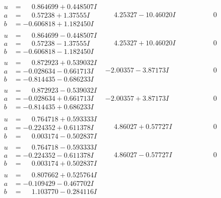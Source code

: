 \documentclass[1p]{elsarticle_modified}
\theoremstyle{definition}
\begin{document}
$$\begin{array}{c|c|c}
\begin{aligned}
u &= \phantom{-}0.864699 + 0.448507 I \\
a &= \phantom{-}0.57238 + 1.37555 I \\
b &= -0.606818 + 1.182450 I\end{aligned}
 & \phantom{-}4.25327 - 10.46020 I & \phantom{-0.000000 } 0 \\ \hline\begin{aligned}
u &= \phantom{-}0.864699 - 0.448507 I \\
a &= \phantom{-}0.57238 - 1.37555 I \\
b &= -0.606818 - 1.182450 I\end{aligned}
 & \phantom{-}4.25327 + 10.46020 I & \phantom{-0.000000 } 0 \\ \hline\begin{aligned}
u &= \phantom{-}0.872923 + 0.539032 I \\
a &= -0.028634 - 0.661713 I \\
b &= -0.814435 - 0.686233 I\end{aligned}
 & -2.00357 - 3.87173 I & \phantom{-0.000000 } 0 \\ \hline\begin{aligned}
u &= \phantom{-}0.872923 - 0.539032 I \\
a &= -0.028634 + 0.661713 I \\
b &= -0.814435 + 0.686233 I\end{aligned}
 & -2.00357 + 3.87173 I & \phantom{-0.000000 } 0 \\ \hline\begin{aligned}
u &= \phantom{-}0.764718 + 0.593333 I \\
a &= -0.224352 + 0.611378 I \\
b &= \phantom{-}0.003174 - 0.502837 I\end{aligned}
 & \phantom{-}4.86027 + 0.57727 I & \phantom{-0.000000 } 0 \\ \hline\begin{aligned}
u &= \phantom{-}0.764718 - 0.593333 I \\
a &= -0.224352 - 0.611378 I \\
b &= \phantom{-}0.003174 + 0.502837 I\end{aligned}
 & \phantom{-}4.86027 - 0.57727 I & \phantom{-0.000000 } 0 \\ \hline\begin{aligned}
u &= \phantom{-}0.807662 + 0.525764 I \\
a &= -0.109429 - 0.467702 I \\
b &= \phantom{-}1.103770 - 0.284116 I\end{aligned}

\end{array}$$
\end{document}
